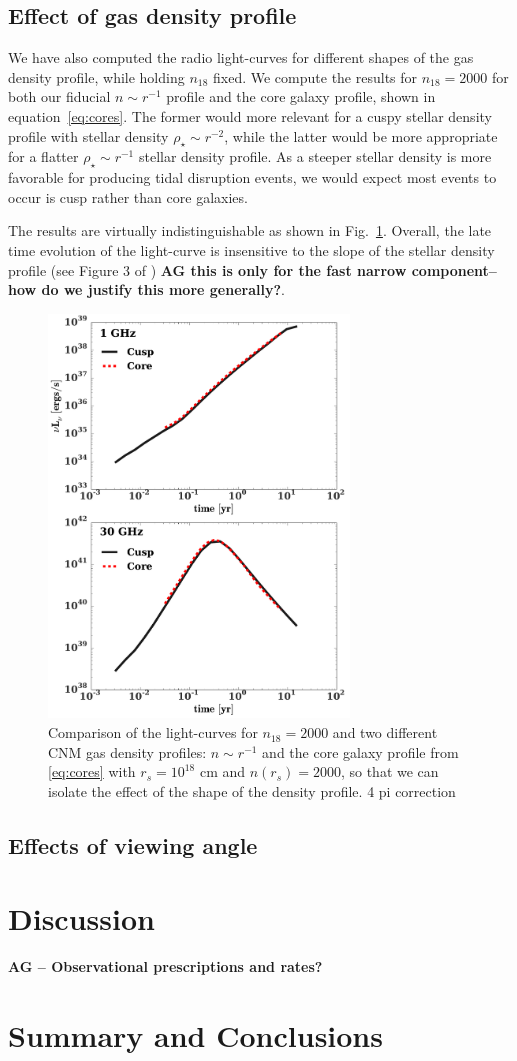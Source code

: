 \documentclass[usenatbib,fleqn]{mnras}
\begin{document}
\subsection{Effect of gas density profile}
We have also computed the radio light-curves for different shapes of
the gas density profile, while holding $n_{18}$ fixed. We compute the
results for $n_{18}=2000$ for both our fiducial $n\sim r^{-1}$ profile and
the core galaxy profile, shown in equation~\eqref{eq:cores}. The
former would more relevant for a cuspy stellar density profile with
stellar density $\rho_{\star}\sim r^{-2}$, while the latter would be more
appropriate for a flatter $\rho_{\star}\sim r^{-1}$ stellar density
profile. As a steeper stellar density is more favorable for producing
tidal disruption events, we would expect most events to occur is cusp
rather than core galaxies.

The results are virtually indistinguishable as shown in
Fig.~\ref{fig:cores}. Overall, the late time evolution of the
light-curve is insensitive to the slope of the stellar density profile
(see Figure 3 of \citealt{Mimica+2015}) {\bf AG this is only for the
  fast narrow component--how do we justify this more generally?}.


\begin{figure} 
  \includegraphics[width=8cm]{fig_cores.pdf}
  \caption{\label{fig:cores} Comparison of the light-curves for
    $n_{18}=2000$ and two different CNM gas density profiles: $n\sim
    r^{-1}$ and the core galaxy profile from \eqref{eq:cores} with
    $r_s=10^{18}$ cm and $n(r_s)=2000$, so that we can isolate the
    effect of the shape of the density profile. 4 pi correction}
\end{figure}


\subsection{Effects of viewing angle}


\section{Discussion}
\label{sec:disc}
{\bf AG -- Observational prescriptions and rates?}

\section{Summary and Conclusions}
\label{sec:conc}

\clearpage
  \footnotesize{
    
    
  }
\end{document}
